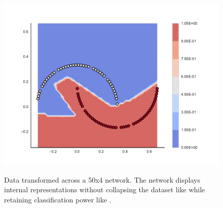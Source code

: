 \begin{figure}[h!]
{{{      \includegraphics[clip, trim=2.35cm 1.75cm 4.5cm 0cm,width=\hsize, height=\hsize]{img/toy/unitpointwise/output.pdf}
      }
    }
  }

    \caption{Data transformed across a 50x4 \SepUnitPoint network. The network displays internal representations without collapsing the dataset like \SepPoint while retaining classification power like \SepUnit.}
    \label{fig:moonsUnitPointwise}
\end{figure}

